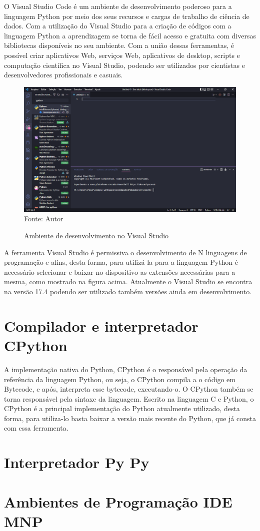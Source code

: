 O Visual Studio Code é um ambiente de desenvolvimento poderoso para a linguagem Python por meio dos seus recursos e cargas de trabalho de ciência de dados. Com a utilização do Visual Studio para a criação de códigos com a linguagem Python a aprendizagem se torna de fácil acesso e gratuita com diversas bibliotecas disponíveis no seu ambiente. Com a união dessas ferramentas, é possível criar aplicativos Web, serviços Web, aplicativos de desktop, scripts e computação científica no Visual Studio, podendo ser utilizados por cientistas e desenvolvedores profissionais e casuais.\\
  \begin{figure}[H]
	\begin{center}
		\caption{Ambiente de desenvolvimento no Visual Studio} \label{ling1}
		\includegraphics[width=15cm]{visualStudioPy.PNG} \\
		{\tiny \sf Fonte:{ Autor}}
	\end{center}
\end{figure}
A ferramenta Visual Studio é permissiva o desenvolvimento de N linguagens de programação e afins, desta forma, para utilizá-la para a linguagem Python é necessário selecionar e baixar no dispositivo as extensões necessárias para a mesma, como mostrado na figura acima. Atualmente o Visual Studio se encontra na versão 17.4 podendo ser utilizado também versões ainda em desenvolvimento.

    \section{Compilador e interpretador CPython}

A implementação nativa do Python, CPython é o responsável pela operação da referência da linguagem Python, ou seja, o CPython compila a o código em Bytecode, e após, interpreta esse bytecode, executando-o. O CPython também se torna responsável pela sintaxe da linguagem. Escrito na linguagem C e Python, o CPython é a principal implementação do Python atualmente utilizado, desta forma, para utiliza-lo basta baixar a versão mais recente do Python, que já consta com essa ferramenta. 


    \section{Interpretador Py Py}


    \section{Ambientes de Programa\c{c}\~{a}o IDE MNP} 